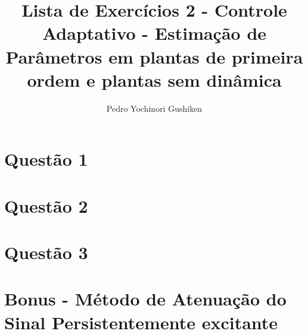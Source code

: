 \documentclass[11pt]{report}
\title{Lista de Exercícios 2 - Controle Adaptativo - Estimação de Parâmetros em plantas de primeira ordem e plantas sem dinâmica}
\author{Pedro Yochinori Gushiken}
\begin{document}
\maketitle
\chapter*{Questão 1}

\chapter*{Questão 2}

\chapter*{Questão 3}

\chapter*{Bonus - Método de Atenuação do Sinal Persistentemente excitante}

\end{document}
